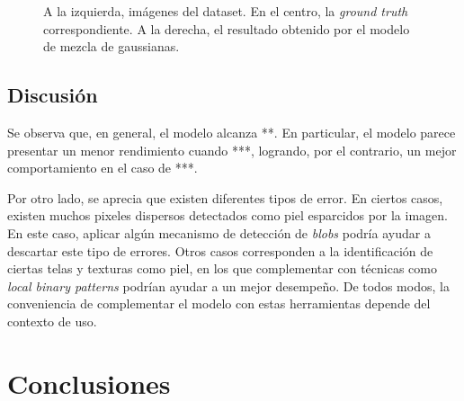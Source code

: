 \documentclass[12pt]{article}
\begin{document}
\begin{figure}[h]
   \hfill{}
    \caption{A la izquierda, imágenes del dataset. En el centro, la \emph{ground
    truth} correspondiente. A la derecha, el resultado obtenido por el modelo de
    mezcla de gaussianas.}
\end{figure}

\subsection{Discusión}

Se observa que, en general, el modelo alcanza **. En particular, el modelo
parece presentar un menor rendimiento cuando ***, logrando, por el contrario, un
mejor comportamiento en el caso de ***. 

Por otro lado, se aprecia que existen diferentes tipos de error. En ciertos
casos, existen muchos pixeles dispersos detectados como piel esparcidos por la
imagen. En este caso, aplicar algún mecanismo de detección de \emph{blobs}
podría ayudar a descartar este tipo de errores. Otros casos corresponden a la
identificación de ciertas telas y texturas como piel, en los que complementar
con técnicas como \emph{local binary patterns} podrían ayudar a un mejor
desempeño. De todos modos, la conveniencia de complementar el modelo con estas
herramientas depende del contexto de uso.

\section{Conclusiones}






%

\begingroup
\centering
{}
\label{fig:f}
\endgroup
\end{document}
